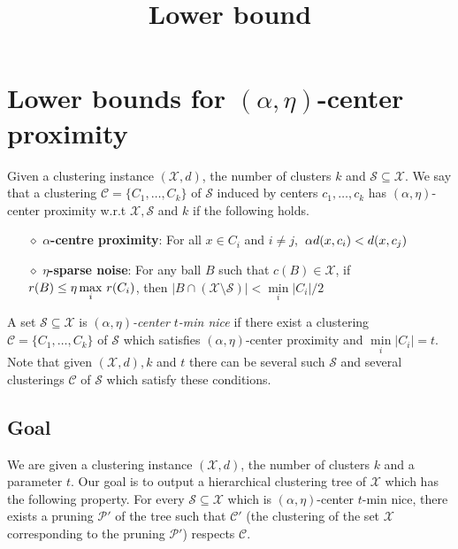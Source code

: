 \documentclass[11pt]{article}
\title{\LARGE Lower bound}
\author{}
\newcommand{\mc}{\mathcal}
\begin{document}
\maketitle

\section{Lower bounds for $(\alpha, \eta)$-center proximity}

\begin{definition}
Given a clustering instance $(\mc X, d)$, the number of clusters $k$ and $\mc S \subseteq \mc X$. We say that a clustering $\mc C = \{C_1, \ldots, C_k\}$ of $\mc S$ induced by centers $c_1, \ldots, c_k$ has $(\alpha, \eta)$-center proximity w.r.t $\mc X, \mc S$ and $k$ if the following holds.

\begin{itemize}[nolistsep, noitemsep]
\label{defn:alphacpnoise}	

\item[$\diamond$] {\bf $\alpha$-centre proximity}: For all $x \in C_i$ and $i\neq j$, $\thinspace\alpha d(x, c_i) < d(x, c_j)$
\item[$\diamond$]{\bf $\eta$-sparse noise}: For any ball $B$ such that $c(B)\in \mathcal{X}$, if $r(B)\leq \eta\max\limits_{i} \thinspace r(C_i)$, then $|B\cap (\mc X\setminus \mc S)| < \min\limits_{i} |C_i|/2$
\end{itemize}
\end{definition}

\noindent A set $\mc S \subseteq \mc X$ is {\it $(\alpha, \eta)$-center} {\it $t$-min nice} if there exist a clustering $\mc C=\{C_1,\ldots,C_k\}$ of $\mc S$ which satisfies $(\alpha, \eta)$-center proximity and $\min\limits_{i} \lvert C_i\rvert = t$. Note that given $(\mc X, d), k$ and $t$ there can be several such $\mc S$ and several clusterings $\mc C$ of $\mc S$ which satisfy these conditions.

\subsection{Goal}
We are given a clustering instance $(\mc X, d)$, the number of clusters $k$ and a parameter $t$.
 Our goal is to output a hierarchical clustering tree of $\mc X$ which has the following property. For every $\mc S \subseteq \mc X$ which is $(\alpha, \eta)$-center $t$-min nice, there exists a pruning $\mc P'$ of the tree such that $\mc C'$ (the clustering of the set $\mc X$ corresponding to the pruning $\mc P'$) respects $\mc C$. 
\end{document}

